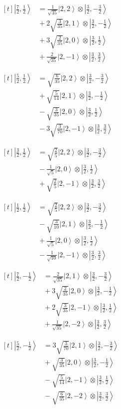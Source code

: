 \documentclass[11pt,a4paper]{article}
\newcommand{\estadocelda}[1]{%
  \begin{minipage}[t]{0.48\linewidth}
  \small\raggedright
  \(\displaystyle\begin{aligned}[t]#1\end{aligned}\)
  \end{minipage}%
}
\newcommand{\ket}[1]{\left|#1\right\rangle}
\begin{document}
\noindent\estadocelda{
\ket{\frac{7}{2},\frac{1}{2}} &= \frac{1}{\sqrt{35}}\ket{2,2}\otimes\ket{\frac{3}{2},-\frac{3}{2}} \\
 &{}+2\sqrt{\frac{3}{35}}\ket{2,1}\otimes\ket{\frac{3}{2},-\frac{1}{2}} \\
 &{}+3\sqrt{\frac{2}{35}}\ket{2,0}\otimes\ket{\frac{3}{2},\frac{1}{2}} \\
 &{}+\frac{2}{\sqrt{35}}\ket{2,-1}\otimes\ket{\frac{3}{2},\frac{3}{2}}
}\hfill\estadocelda{
\ket{\frac{5}{2},\frac{1}{2}} &= \sqrt{\frac{6}{35}}\ket{2,2}\otimes\ket{\frac{3}{2},-\frac{3}{2}} \\
 &{}+\sqrt{\frac{5}{14}}\ket{2,1}\otimes\ket{\frac{3}{2},-\frac{1}{2}} \\
 &{}-\sqrt{\frac{3}{35}}\ket{2,0}\otimes\ket{\frac{3}{2},\frac{1}{2}} \\
 &{}-3\sqrt{\frac{3}{70}}\ket{2,-1}\otimes\ket{\frac{3}{2},\frac{3}{2}}
}\par\addvspace{1.4em}

\noindent\estadocelda{
\ket{\frac{3}{2},\frac{1}{2}} &= \sqrt{\frac{2}{5}}\ket{2,2}\otimes\ket{\frac{3}{2},-\frac{3}{2}} \\
 &{}-\frac{1}{\sqrt{5}}\ket{2,0}\otimes\ket{\frac{3}{2},\frac{1}{2}} \\
 &{}+\sqrt{\frac{2}{5}}\ket{2,-1}\otimes\ket{\frac{3}{2},\frac{3}{2}}
}\hfill\estadocelda{
\ket{\frac{1}{2},\frac{1}{2}} &= \sqrt{\frac{2}{5}}\ket{2,2}\otimes\ket{\frac{3}{2},-\frac{3}{2}} \\
 &{}-\sqrt{\frac{3}{10}}\ket{2,1}\otimes\ket{\frac{3}{2},-\frac{1}{2}} \\
 &{}+\frac{1}{\sqrt{5}}\ket{2,0}\otimes\ket{\frac{3}{2},\frac{1}{2}} \\
 &{}-\frac{1}{\sqrt{10}}\ket{2,-1}\otimes\ket{\frac{3}{2},\frac{3}{2}}
}\par\addvspace{1.4em}

\noindent\estadocelda{
\ket{\frac{7}{2},-\frac{1}{2}} &= \frac{2}{\sqrt{35}}\ket{2,1}\otimes\ket{\frac{3}{2},-\frac{3}{2}} \\
 &{}+3\sqrt{\frac{2}{35}}\ket{2,0}\otimes\ket{\frac{3}{2},-\frac{1}{2}} \\
 &{}+2\sqrt{\frac{3}{35}}\ket{2,-1}\otimes\ket{\frac{3}{2},\frac{1}{2}} \\
 &{}+\frac{1}{\sqrt{35}}\ket{2,-2}\otimes\ket{\frac{3}{2},\frac{3}{2}}
}\hfill\estadocelda{
\ket{\frac{5}{2},-\frac{1}{2}} &= 3\sqrt{\frac{3}{70}}\ket{2,1}\otimes\ket{\frac{3}{2},-\frac{3}{2}} \\
 &{}+\sqrt{\frac{3}{35}}\ket{2,0}\otimes\ket{\frac{3}{2},-\frac{1}{2}} \\
 &{}-\sqrt{\frac{5}{14}}\ket{2,-1}\otimes\ket{\frac{3}{2},\frac{1}{2}} \\
 &{}-\sqrt{\frac{6}{35}}\ket{2,-2}\otimes\ket{\frac{3}{2},\frac{3}{2}}
}\par\addvspace{1.4em}
\end{document}
